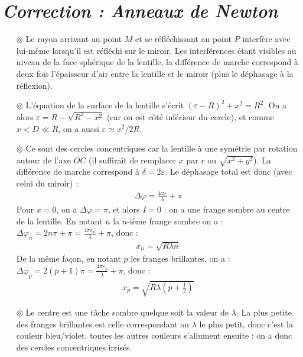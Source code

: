 \documentclass{report}
\begin{document}
\newpage

\section*{\textit{Correction : Anneaux de Newton}}

\begin{itemize}

	\item[$\circledcirc$] Le rayon arrivant au point $M$ et se réfléchissant au point $P$ interfère avec lui-même lorsqu'il est réfléchi sur le miroir. Les interférences étant visibles au niveau de la face sphérique de la lentille, la différence de marche correspond à deux fois l'épaisseur d'air entre la lentille et le miroir (plus le déphasage à la réflexion).
	
	\item[$\circledcirc$] L'équation de la surface de la lentille s'écrit $(\varepsilon-R)^2+x^2=R^2$. On a alors $\varepsilon=R-\sqrt{R^2-x^2}$ (car on est côté inférieur du cercle), et comme $x<D\ll R$, on a aussi $\varepsilon\simeq x^2/2R$.
	
	\item[$\circledcirc$] Ce sont des cercles concentriques car la lentille à une symétrie par rotation autour de l'axe $OC$ (il suffirait de remplacer $x$ par $r$ ou $\sqrt{x^2+y^2}$). La différence de marche correspond à $\delta=2\varepsilon$. Le déphasage total est donc (avec celui du miroir) :
	\begin{align*}
		\Delta \varphi = \frac{4\pi\varepsilon}{\lambda}+\pi
	\end{align*}
	Pour $x=0$, on a $\Delta \varphi = \pi$, et alors $I=0$ : on a une frange sombre au centre de la lentille. En notant $n$ la $n$-ième frange sombre on a : $\Delta\varphi_n=2n\pi+\pi=\frac{4\pi\varepsilon_n}{\lambda}+\pi$, donc :
	\begin{align*}
		x_n=\sqrt{R\lambda n}
	\end{align*}
	De la même façon, en notant $p$ les franges brillantes, on a :
	$\Delta\varphi_p=2(p+1)\pi=\frac{4\pi\varepsilon_p}{\lambda}+\pi$, donc :
	\begin{align*}
		x_p=\sqrt{R\lambda \left( p+\frac{1}{2}\right) }
	\end{align*}
	
	\item[$\circledcirc$] Le centre est une tâche sombre quelque soit la valeur de $\lambda$. La plus petite des franges brillantes est celle correspondant au $\lambda$ le plus petit, donc c'est la couleur bleu/violet. toutes les autres couleurs s'allument ensuite : on a donc des cercles concentriques irrisés. 

\end{itemize}
\end{document}
